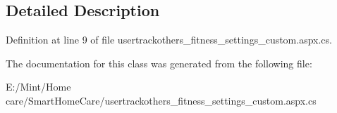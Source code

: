 \subsection{Detailed Description}


Definition at line 9 of file usertrackothers\-\_\-fitness\-\_\-settings\-\_\-custom.\-aspx.\-cs.



The documentation for this class was generated from the following file\-:\begin{DoxyCompactItemize}
\item 
E\-:/\-Mint/\-Home care/\-Smart\-Home\-Care/usertrackothers\-\_\-fitness\-\_\-settings\-\_\-custom.\-aspx.\-cs\end{DoxyCompactItemize}
